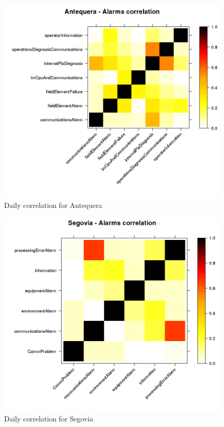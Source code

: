 \documentclass[a4paper,12pt]{article}
\begin{document}
\begin{figure}[htb]
 \centering
 \includegraphics[width=\textwidth]{./img/antequera_corr.png}
 \caption{Daily correlation for Antequera} \label{fig:anteq_corr}
\end{figure}
\begin{figure}[htb]
 \centering
 \includegraphics[width=\textwidth]{./img/segovia_corr.png}
 \caption{Daily correlation for Segovia} \label{fig:segovia_corr}
\end{figure}
\end{document}
